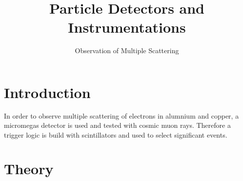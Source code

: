 \documentclass[sn-mathphys-num,iicol]{sn-jnl}
\theoremstyle{thmstyleone}
\theoremstyle{thmstyletwo}
\theoremstyle{thmstylethree}
\begin{document}
        
\title[]{Particle Detectors and Instrumentations}
\subtitle{Observation of Multiple Scattering}
\author*[1]{ }
\author*[1]{ }

\maketitle

\section{Introduction}
In order to observe multiple scattering of electrons in alumnium and copper, a micromegas detector is used and tested with cosmic muon rays. Therefore a trigger logic is build with scintillators and used to select significant events.



\section{Theory}\label{sec:theory}
\end{document}
